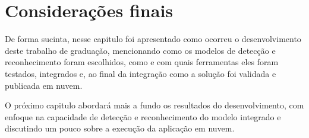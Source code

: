 \section{Considerações finais}
De forma sucinta, nesse capitulo foi apresentado como ocorreu o desenvolvimento deste trabalho de graduação, mencionando como os modelos de detecção e reconhecimento foram escolhidos, como e com quais ferramentas eles foram testados, integrados e, ao final da integração como a solução foi validada e publicada em nuvem.

O próximo capitulo abordará mais a fundo os resultados do desenvolvimento, com enfoque na capacidade de detecção e reconhecimento do modelo integrado e discutindo um pouco sobre a execução da aplicação em nuvem.